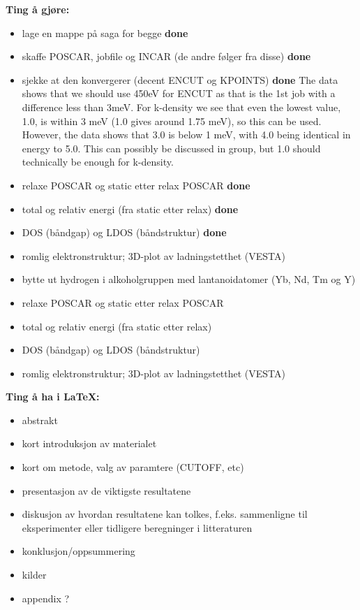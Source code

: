 \documentclass{article}
\begin{document}
\textbf{Ting å gjøre:}
\begin{itemize}
    \item lage en mappe på saga for begge
    \subitem \textbf{done}
    \item skaffe POSCAR, jobfile og INCAR (de andre følger fra disse)
    \subitem \textbf{done}
    \item sjekke at den konvergerer (decent ENCUT og KPOINTS)
    \subitem \textbf{done}
    \subitem The data shows that we should use 450eV for ENCUT as that is the 1st job with a difference less than 3meV.
    \subitem For k-density we see that even the lowest value, 1.0, is within 3 meV (1.0 gives around 1.75 meV), so this can be used. However, the data shows that 3.0 is below 1 meV, with 4.0 being identical in energy to 5.0. This can possibly be discussed in group, but 1.0 should technically be enough for k-density.
    \item relaxe POSCAR og static etter relax POSCAR
    \subitem \textbf{done}
    \item total og relativ energi (fra static etter relax)
    \subitem \textbf{done}
    \item DOS (båndgap) og LDOS (båndstruktur)
    \subitem \textbf{done}
    \item romlig elektronstruktur; 3D-plot av ladningstetthet (VESTA)
    \item bytte ut hydrogen i alkoholgruppen med lantanoidatomer (Yb, Nd, Tm og Y)
    \item relaxe POSCAR og static etter relax POSCAR
    \item total og relativ energi (fra static etter relax)
    \item DOS (båndgap) og LDOS (båndstruktur)
    \item romlig elektronstruktur; 3D-plot av ladningstetthet (VESTA)
\end{itemize}

\vspace{1cm}

\textbf{Ting å ha i \LaTeX:}
\begin{itemize}
    \item abstrakt
    \item kort introduksjon av materialet
    \item kort om metode, valg av paramtere (CUTOFF, etc)
    \item presentasjon av de viktigste resultatene
    \item diskusjon av hvordan resultatene kan tolkes, f.eks. sammenligne til eksperimenter eller tidligere beregninger i litteraturen
    \item konklusjon/oppsummering
    \item kilder
    \item appendix ?
\end{itemize}
\end{document}
